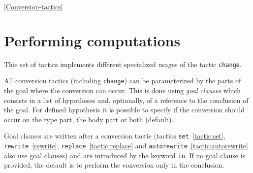 
\SeeAlso \ref{Conversion-tactics}


\section{Performing computations
\label{Conversion-tactics}}

This set of tactics implements different specialized usages of the
tactic \texttt{change}.

All conversion tactics (including \texttt{change}) can be
parameterized by the parts of the goal where the conversion can
occur. This is done using \emph{goal clauses} which consists in a list
of hypotheses and, optionally, of a reference to the conclusion of the
goal. For defined hypothesis it is possible to specify if the
conversion should occur on the type part, the body part or both
(default).

Goal clauses are written after a conversion tactic (tactics
\texttt{set}~\ref{tactic:set},          \texttt{rewrite}~\ref{rewrite},
\texttt{replace}~\ref{tactic:replace}                               and
\texttt{autorewrite}~\ref{tactic:autorewrite} also use goal clauses)  and
are introduced by  the keyword \texttt{in}. If no goal clause is provided,
the default is to perform the conversion only in the conclusion.

